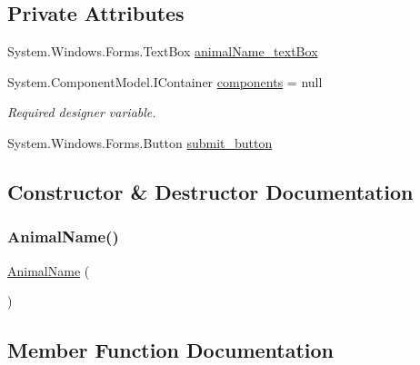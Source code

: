 \subsection*{Private Attributes}
\begin{DoxyCompactItemize}
\item 
System.\+Windows.\+Forms.\+Text\+Box \hyperlink{classWildlifeTrackingApp_1_1AnimalName_abb2c1d4dd8e970c30d810f5238785813}{animal\+Name\+\_\+text\+Box}
\item 
System.\+Component\+Model.\+I\+Container \hyperlink{classWildlifeTrackingApp_1_1AnimalName_a02595f1c09713bb71dcb2fbbfc7ffa4b}{components} = null
\begin{DoxyCompactList}\small\item\em Required designer variable. \end{DoxyCompactList}\item 
System.\+Windows.\+Forms.\+Button \hyperlink{classWildlifeTrackingApp_1_1AnimalName_a6c7fe113bfa091362451d2814c3c108a}{submit\+\_\+button}
\end{DoxyCompactItemize}


\subsection{Constructor \& Destructor Documentation}
\mbox{\label{classWildlifeTrackingApp_1_1AnimalName_a77c9c1ee4d566c59e85c75f4382ccb39}} 
\subsubsection{\texorpdfstring{Animal\+Name()}{AnimalName()}}
{\footnotesize\ttfamily \hyperlink{classWildlifeTrackingApp_1_1AnimalName}{Animal\+Name} (\begin{DoxyParamCaption}{ }\end{DoxyParamCaption})\hspace{0.3cm}{\ttfamily [inline]}}



\subsection{Member Function Documentation}
\mbox{\label{classWildlifeTrackingApp_1_1AnimalName_a849c3c7f8d08104f0cdb46bee9fe6389}} 
